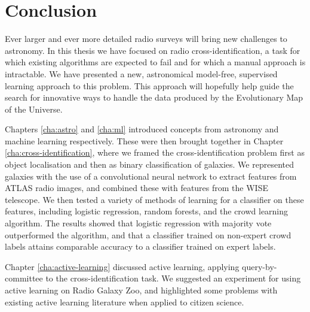 
\chapter{Conclusion}
\label{cha:conclusion}

    Ever larger and ever more detailed radio surveys will bring new challenges
    to astronomy. In this thesis we have focused on radio cross-identification,
    a task for which existing algorithms are expected to fail and for which a
    manual approach is intractable. We have presented a new, astronomical
    model-free, supervised learning approach to this problem. This approach will
    hopefully help guide the search for innovative ways to handle the data
    produced by the Evolutionary Map of the Universe.

    Chapters \ref{cha:astro} and \ref{cha:ml} introduced concepts from astronomy
    and machine learning respectively. These were then brought together in
    Chapter \ref{cha:cross-identification}, where we framed the
    cross-identification problem first as object localisation and then as binary
    classification of galaxies. We represented galaxies with the use of a
    convolutional neural network to extract features from ATLAS radio images,
    and combined these with features from the WISE telescope. We then tested a
    variety of methods of learning for a classifier on these features, including
    logistic regression, random forests, and the \citet{raykar10} crowd learning
    algorithm. The results showed that logistic regression with majority vote
    outperformed the
    \citeauthor{raykar10} algorithm, and that a classifier trained on non-expert
    crowd labels attains comparable accuracy to a classifier trained on expert
    labels.

    Chapter \ref{cha:active-learning} discussed active learning, applying
    query-by-committee to the cross-identification task. We suggested an
    experiment for using active learning on Radio Galaxy Zoo, and highlighted
    some problems with existing active learning literature when applied to
    citizen science.

